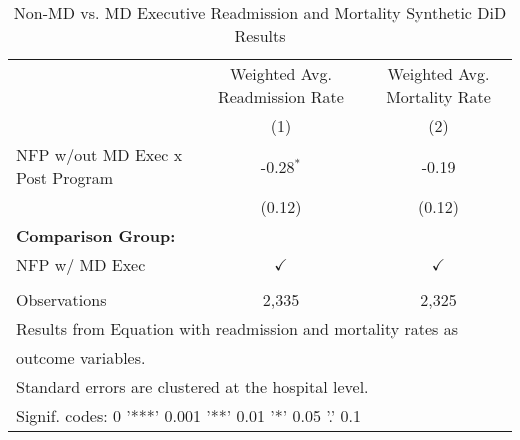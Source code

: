 \begin{table}[ht!]

\caption{\label{tab:MD_noMD_readmort_synth}Non-MD vs. MD Executive Readmission and Mortality Synthetic DiD Results}
\centering
\begin{tabular}[t]{lcc}
\toprule
\multicolumn{1}{c}{ } & \multicolumn{1}{c}{Weighted Avg. Readmission Rate} & \multicolumn{1}{c}{Weighted Avg. Mortality Rate} \\
 & (1) & (2)\\
\midrule
NFP w/out MD Exec x Post Program & -0.28$^{*}$ & -0.19\\
 & (0.12) & (0.12)\\
\textbf{Comparison Group:} &  & \\
NFP w/ MD Exec & $\checkmark$ & $\checkmark$\\
 &  & \\
\addlinespace
Observations & 2,335 & 2,325\\
\bottomrule
\multicolumn{3}{l}{\textsuperscript{} Results from Equation with readmission and mortality rates as}\\
\multicolumn{3}{l}{outcome variables.}\\
\multicolumn{3}{l}{\textsuperscript{} Standard errors are clustered at the hospital level.}\\
\multicolumn{3}{l}{\textsuperscript{} Signif. codes: 0 '***' 0.001 '**' 0.01 '*' 0.05 '.' 0.1}\\
\end{tabular}
\end{table}
